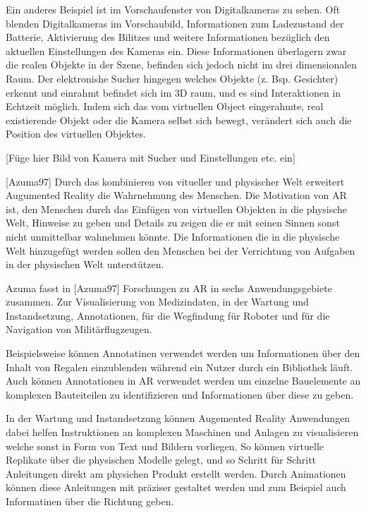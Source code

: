 Ein anderes Beispiel ist im Vorschaufenster von Digitalkameras zu sehen. Oft blenden Digitalkameras im Vorschaubild, Informationen zum Ladezustand der Batterie, Aktivierung des Bilitzes und weitere 
Informationen bezüglich den aktuellen Einstellungen des Kameras ein. Diese Informationen überlagern zwar die realen Objekte in der Szene, befinden sich jedoch nicht im drei dimensionalen Raum. 
Der elektronishe Sucher hingegen welches Objekte (z. Bsp. Gesichter) erkennt und einrahmt befindet sich im 3D raum, und es sind Interaktionen in Echtzeit möglich. Indem sich das vom virtuellen  Object 
eingerahmte, real existierende Objekt oder die Kamera selbst sich bewegt, verändert sich auch die Position des virtuellen Objektes. 

[Füge hier Bild von Kamera mit Sucher und Einstellungen etc. ein]

[Azuma97] Durch das kombinieren von vitueller und physischer Welt erweitert Augumented Reality die Wahrnehmung des Menschen. Die Motivation von AR ist, den Menschen durch das Einfügen
von virtuellen Objekten in die physische Welt, Hinweise zu geben und Details zu zeigen die er mit seinen Sinnen sonst nicht unmittelbar wahnehmen könnte. Die Informationen die in die physische 
Welt hinzugefügt werden sollen den Menschen bei der Verrichtung von Aufgaben in der physischen Welt unterstützen.

Azuma fasst in [Azuma97]  Forschungen zu AR in sechs Anwendungsgebiete zusammen. Zur Visualisierung von Medizindaten, in der Wartung 
und Instandsetzung, Annotationen, für die Wegfindung für Roboter und für die Navigation von Militärflugzeugen. 

Beispielsweise können Annotatinen verwendet werden um Informationen über den Inhalt von Regalen einzublenden während ein Nutzer durch ein Bibliothek läuft. %
Auch können Annotationen in AR verwendet werden um einzelne Bauelemente an komplexen Bauteiteilen zu identifizieren und Informationen über diese zu geben. 

In der Wartung und Instandsetzung können Augemented Reality Anwendungen dabei helfen Instruktionen an komplexen Maschinen und Anlagen zu visualisieren welche sonst in 
Form von Text und Bildern vorliegen. So können virtuelle Replikate über die physischen Modelle gelegt, und so Schritt für Schritt Anleitungen direkt am physichen Produkt erstellt werden. 
Durch Animationen können diese Anleitungen mit präziser gestaltet werden und zum Beispiel auch Informatinen über die Richtung geben. 

